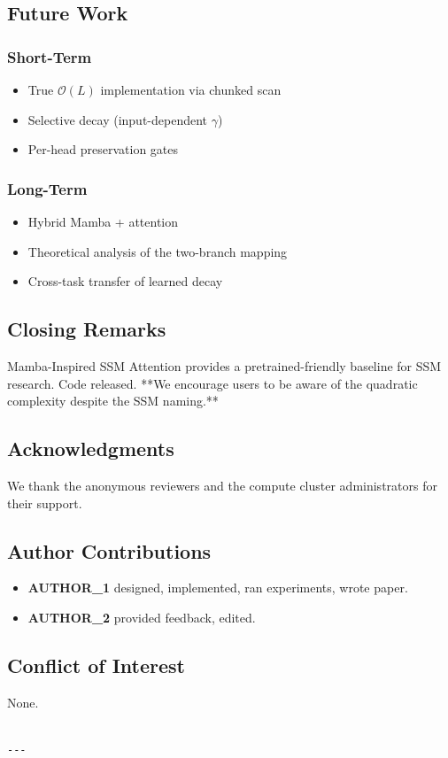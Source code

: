 \subsection{Future Work}

\subsubsection{Short-Term}
\begin{itemize}
\item True $\mathcal{O}(L)$ implementation via chunked scan
\item Selective decay (input-dependent $\gamma$)
\item Per-head preservation gates

\end{itemize}
\subsubsection{Long-Term}
\begin{itemize}
\item Hybrid Mamba + attention
\item Theoretical analysis of the two-branch mapping
\item Cross-task transfer of learned decay

\end{itemize}
\subsection{Closing Remarks}

Mamba-Inspired SSM Attention provides a pretrained-friendly baseline for 
SSM research. Code released. **We encourage users to be aware of the 
quadratic complexity despite the SSM naming.**

\subsection{Acknowledgments}

We thank the anonymous reviewers and the compute cluster administrators for their support.

\subsection{Author Contributions}

\begin{itemize}
\item \textbf{{{AUTHOR\_1}}} designed, implemented, ran experiments, wrote paper.
\item \textbf{{{AUTHOR\_2}}} provided feedback, edited.

\end{itemize}
\subsection{Conflict of Interest}

None.
\begin{lstlisting}

---
\end{lstlisting}